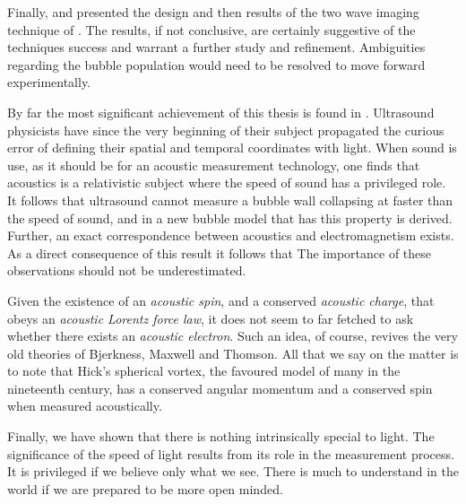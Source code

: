 Finally,  and  presented the 
design  and then results of the two wave imaging technique of .
The results, if not conclusive, are certainly suggestive of the techniques success
and warrant a further study and refinement.
Ambiguities regarding the bubble population would need to be resolved to move forward experimentally.


By far the most significant achievement of this thesis is found in .
Ultrasound physicists have since the very beginning of their subject propagated the curious
error of defining their spatial and temporal coordinates with light.
When sound is use, 
as it should be for an acoustic measurement technology,
one finds that acoustics is a relativistic subject where the speed of sound has a privileged role.
It follows that ultrasound cannot measure a bubble wall collapsing at faster than the speed of sound,
and in  a new bubble model that has this property is derived.
Further, an exact correspondence between acoustics and electromagnetism exists.
As a direct consequence of this result it follows that 
The importance of these observations should not be underestimated.

Given the existence of an {\em acoustic spin},  and a conserved {\em acoustic charge},
that obeys an {\em acoustic Lorentz force law},
it does not seem to far fetched to ask whether there exists an {\em acoustic electron}.
Such an idea, of course, 
revives the very old theories of Bjerkness\cite{Bjerknes1905}, Maxwell\cite{Maxwell1861} and Thomson\cite{Thomson1931}.
All that we say on the matter is to note that 
Hick's spherical vortex, the favoured model of many in the nineteenth century,
has a conserved angular momentum\cite{Pekeris1976,Pekeris1977} and a conserved spin\cite{Moffatt1969,Moffatt1988}
when measured acoustically.

Finally, 
we have shown that there is nothing intrinsically special to light.
The significance of the speed of light results from its  role in the measurement process.
It is privileged if we believe only what we see.
There is much to understand in the world if we are prepared to be more open minded.


